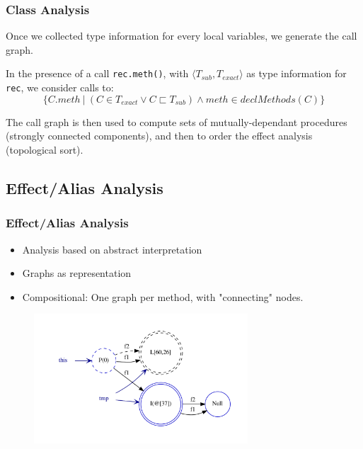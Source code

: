 \documentclass[hyperref={pdfpagelabels=false}]{beamer}
\begin{document}
\begin{frame}[fragile]
    \frametitle{Class Analysis}
    Once we collected type information for every local variables, we generate
    the call graph.

    In the presence of a call \lstinline{rec.meth()}, with
    $\langle T_{sub}, T_{exact} \rangle$ as type information for \lstinline{rec},
    we consider calls to:
    $$
    \{ C.meth ~|~ (C \in T_{exact} \lor C \sqsubset T_{sub}) \land meth \in declMethods(C)\}
    $$

    The call graph is then used to compute sets of mutually-dependant
    procedures (strongly connected components), and then to order the effect
    analysis (topological sort).
\end{frame}

\subsection{Effect/Alias Analysis}
\begin{frame}
    \frametitle{Effect/Alias Analysis}
    \begin{itemize}
        \item Analysis based on abstract interpretation
        \item Graphs as representation
        \item Compositional: One graph per method, with "connecting" nodes.
    \end{itemize}

    \begin{figure}[t]
        \includegraphics[width=80mm]{images/pt_graph1.pdf}\\
    \end{figure}
\end{frame}
\end{document}
